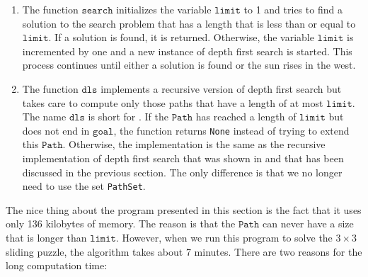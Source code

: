 \begin{enumerate}
\item The function $\texttt{search}$ initializes the variable $\texttt{limit}$ to 1 and tries to find a solution
      to the search problem that has a length that is less than or equal to $\texttt{limit}$.  If a solution is
      found, it is returned.  Otherwise, the variable $\texttt{limit}$ is incremented by one and a
      new instance of depth first search is started.  This process continues until either 
      a solution is found or the sun rises in the west.
\item The function $\texttt{dls}$ implements a recursive version of depth first search but takes care to compute only
      those paths that have a length of at most $\texttt{limit}$.  The name $\texttt{dls}$ is short for 
      .  If the $\texttt{Path}$ has reached a length
      of $\texttt{limit}$ but does not end in $\texttt{goal}$, the function returns \texttt{None} instead of
      trying to extend this $\texttt{Path}$.  Otherwise, the implementation is the same as the recursive
      implementation of depth first search that was shown in 
      and that has been discussed in the previous section.  The only difference is that we no longer need to
      use the set \texttt{PathSet}.

\end{enumerate}
The nice thing about the program presented in this section is the fact that it uses only 136 kilobytes of
memory.  The reason is that the $\texttt{Path}$ can never have a size that is longer than $\texttt{limit}$.
However, when we run this program to solve the $3 \times 3$ sliding puzzle, the algorithm takes
about 7 minutes.  There are two reasons for the long computation time:
